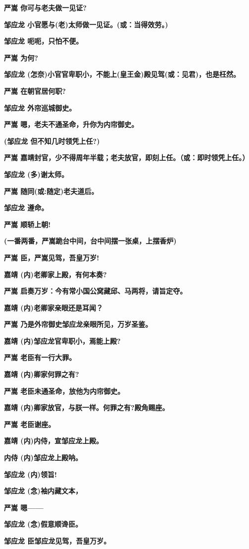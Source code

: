 \textbf{严嵩 你可与老夫做一见证?}

\textbf{邹应龙 小官愿与(老)太师做一见证。(或：当得效劳。)}

\textbf{邹应龙 呃呃，只怕不便。}

\textbf{严嵩 为何?}

\textbf{邹应龙
(怎奈)小官官卑职小，不能上(皇王金)殿见驾(或：见君)，也是枉然。}

\textbf{严嵩 在朝官居何职?}

\textbf{邹应龙 外帘巡城御史。}

\textbf{严嵩 嗯，老夫不通圣命，升你为内帘御史。}

\textbf{(邹应龙 但不知几时领凭上任?)}

\textbf{严嵩
嘉靖封官，少不得周年半载；老夫放官，即刻上任。（或：即时领凭上任。）}

\textbf{邹应龙 (多)谢太师。}

\textbf{严嵩 随同(或:随定)老夫道后。}

\textbf{邹应龙 遵命。}

\textbf{严嵩 顺轿上朝!}

\textbf{(一番两番，严嵩跪台中间，台中间摆一张桌，上摆香炉)}

\textbf{严嵩 臣，严嵩见驾，吾皇万岁!}

\textbf{嘉靖 (内)老卿家上殿，有何本奏?}

\textbf{严嵩 启奏万岁：今有常小国公窝藏邱、马两将，请旨定夺。}

\textbf{嘉靖 (内)老卿家亲眼还是耳闻？}

\textbf{严嵩 乃是外帘御史邹应龙亲眼所见，万岁圣鉴。}

\textbf{嘉靖 (内)邹应龙官卑职小，焉能上殿?}

\textbf{严嵩 老臣有一行大罪。}

\textbf{嘉靖 (内)卿家何罪之有?}

\textbf{严嵩 老臣未通圣命，放他为内帘御史。}

\textbf{嘉靖 (内)卿家放官，与朕一样。何罪之有?殿角赐座。}

\textbf{严嵩 老臣谢座。}

\textbf{嘉靖 (内)内侍，宣邹应龙上殿。}

\textbf{内侍 (内)邹应龙上殿呐。}

\textbf{邹应龙 (内)领旨!}

\textbf{邹应龙 (念)袖内藏文本，}

\textbf{严嵩 嗯------}

\textbf{邹应龙 (念)假意顺谗臣。}

\textbf{邹应龙 臣邹应龙见驾，吾皇万岁。}


